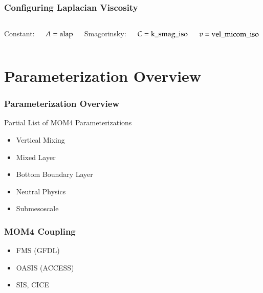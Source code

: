 \documentclass[red]{beamer}
\begin{document}
\begin{frame}
    \frametitle{Configuring Laplacian Viscosity}
    
    \begin{columns}
        
        Constant:
        
        $A = \text{\lstinline|alap|}$
        
        \vspace{10pt}
        
        Smagorinsky:
        
        $C = \text{\lstinline|k_smag_iso|}$
        
        $v = \text{\lstinline|vel_micom_iso|}$
    \end{columns}
\end{frame}

\section{Parameterization Overview}
\begin{frame}
    \frametitle{Parameterization Overview}
    
    Partial List of MOM4 Parameterizations
    \begin{itemize}
        \item Vertical Mixing
        \item Mixed Layer
        \item Bottom Boundary Layer
        \item Neutral Physics
        \item Submesoscale
    \end{itemize}
\end{frame}

\begin{frame}
    \frametitle{MOM4 Coupling}
    
    \begin{itemize}
        \item FMS (GFDL)
        \item OASIS (ACCESS)
        \item SIS, CICE
    \end{itemize}
\end{frame}

\end{document}
